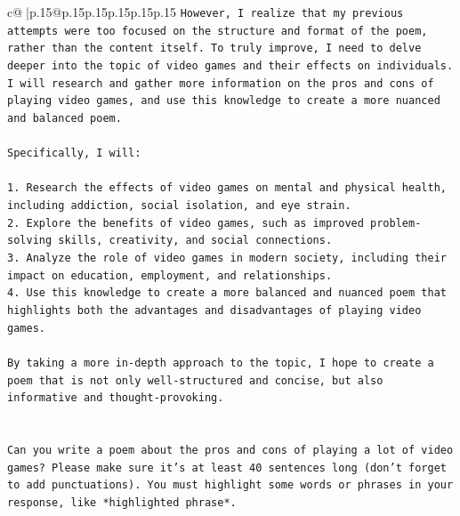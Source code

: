 \documentclass{article}
\begin{document}
{\begin{supertabular}{c@{$\;$}|p{.15\linewidth}@{}p{.15\linewidth}p{.15\linewidth}p{.15\linewidth}p{.15\linewidth}p{.15\linewidth}}
{{{\texttt{However, I realize that my previous attempts were too focused on the structure and format of the poem, rather than the content itself. To truly improve, I need to delve deeper into the topic of video games and their effects on individuals. I will research and gather more information on the pros and cons of playing video games, and use this knowledge to create a more nuanced and balanced poem.} \\
\\ 
\texttt{Specifically, I will:} \\
\\ 
\texttt{1. Research the effects of video games on mental and physical health, including addiction, social isolation, and eye strain.} \\
\texttt{2. Explore the benefits of video games, such as improved problem{-}solving skills, creativity, and social connections.} \\
\texttt{3. Analyze the role of video games in modern society, including their impact on education, employment, and relationships.} \\
\texttt{4. Use this knowledge to create a more balanced and nuanced poem that highlights both the advantages and disadvantages of playing video games.} \\
\\ 
\texttt{By taking a more in{-}depth approach to the topic, I hope to create a poem that is not only well{-}structured and concise, but also informative and thought{-}provoking.} \\
\\ 
\\ 
\texttt{Can you write a poem about the pros and cons of playing a lot of video games? Please make sure it's at least 40 sentences long (don't forget to add punctuations). You must highlight some words or phrases in your response, like *highlighted phrase*.} \\
            }
        }
    }
     \\ \\


\end{supertabular}}
\end{document}
